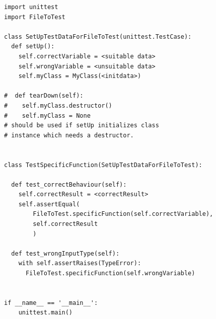 \documentclass[10pt,a4paper]{article}
\begin{document}
\begin{lstlisting}
import unittest
import FileToTest 

class SetUpTestDataForFileToTest(unittest.TestCase):
  def setUp():
    self.correctVariable = <suitable data>
    self.wrongVariable = <unsuitable data>
    self.myClass = MyClass(<initdata>) 
    
#  def tearDown(self):  
#    self.myClass.destructor()  
#    self.myClass = None
# should be used if setUp initializes class  
# instance which needs a destructor.


class TestSpecificFunction(SetUpTestDataForFileToTest):

  def test_correctBehaviour(self):
    self.correctResult = <correctResult>
    self.assertEqual(
        FileToTest.specificFunction(self.correctVariable), 
        self.correctResult
        )

  def test_wrongInputType(self):
    with self.assertRaises(TypeError):
      FileToTest.specificFunction(self.wrongVariable)


if __name__ == '__main__':
    unittest.main()

\end{lstlisting}
\end{document}

